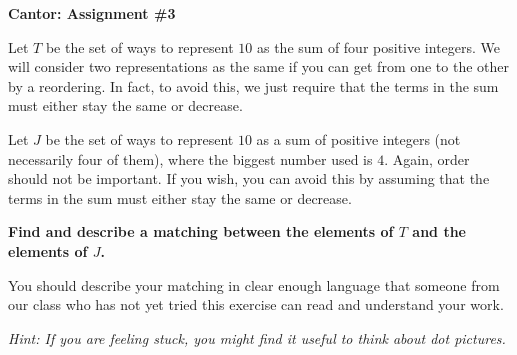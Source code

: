 \documentclass[12pt,letterpaper]{article}
\begin{document}
\setlength{\parskip}{1ex plus 0.5ex minus 0.2ex}
\setlength{\parindent}{0pt}

\pagestyle{fancy}
\lfoot{}
\rfoot{}

\begin{center}
{
\Large
\textbf{Cantor: Assignment \#3}
}
\end{center}

Let $T$ be the set of ways to represent $10$ as the sum of four positive integers. 
We will consider two representations as the same if you can get from one to the other by  a reordering. 
In fact, to avoid this, we just require that the terms in the sum must either stay the same or decrease.

Let $J$ be the set of ways to represent $10$ as a sum of positive integers (not necessarily four of them), where the biggest number used is $4$.
Again, order should not be important.
If you wish, you can avoid this by assuming that the terms in the sum must either stay the same or decrease.

\textbf{Find and describe a matching between the elements of $T$ and the elements of $J$.}

You should describe your matching in clear enough language that someone from our class who has not yet tried this exercise can read and understand your work.

\vspace{1in}

\textit{Hint: If you are feeling stuck, you might find it useful to think about dot pictures.}
\end{document}
